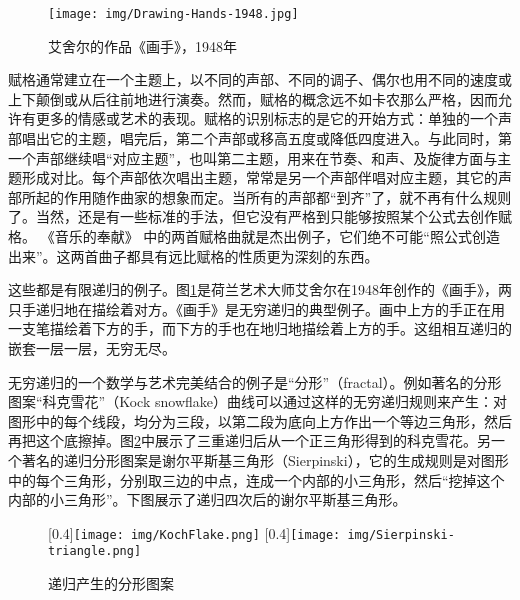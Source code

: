 \documentclass[b5paper]{ctexart}
\begin{document}
\begin{figure}[htbp]
 \centering
 \texttt{[image: img/Drawing-Hands-1948.jpg]}
 \caption{艾舍尔的作品《画手》，1948年}
 \label{fig:Drawing-Hands}
\end{figure}

赋格通常建立在一个主题上，以不同的声部、不同的调子、偶尔也用不同的速度或上下颠倒或从后往前地进行演奏。然而，赋格的概念远不如卡农那么严格，因而允许有更多的情感或艺术的表现。赋格的识别标志的是它的开始方式：单独的一个声部唱出它的主题，唱完后，第二个声部或移高五度或降低四度进入。与此同时，第一个声部继续唱“对应主题”，也叫第二主题，用来在节奏、和声、及旋律方面与主题形成对比。每个声部依次唱出主题，常常是另一个声部伴唱对应主题，其它的声部所起的作用随作曲家的想象而定。当所有的声部都“到齐”了，就不再有什么规则了。当然，还是有一些标准的手法，但它没有严格到只能够按照某个公式去创作赋格。 《音乐的奉献》 中的两首赋格曲就是杰出例子，它们绝不可能“照公式创造出来”。这两首曲子都具有远比赋格的性质更为深刻的东西\cite{GEB}。

这些都是有限递归的例子。图\ref{fig:Drawing-Hands}是荷兰艺术大师艾舍尔在1948年创作的《画手》，两只手递归地在描绘着对方。《画手》是无穷递归的典型例子。画中上方的手正在用一支笔描绘着下方的手，而下方的手也在地归地描绘着上方的手。这组相互递归的嵌套一层一层，无穷无尽。

无穷递归的一个数学与艺术完美结合的例子是“分形”（fractal）。例如著名的分形图案“科克雪花”（Kock snowflake）曲线可以通过这样的无穷递归规则来产生：对图形中的每个线段，均分为三段，以第二段为底向上方作出一个等边三角形，然后再把这个底擦掉。图\ref{fig:fractal}中展示了三重递归后从一个正三角形得到的科克雪花。另一个著名的递归分形图案是谢尔平斯基三角形（Sierpinski），它的生成规则是对图形中的每个三角形，分别取三边的中点，连成一个内部的小三角形，然后“挖掉这个内部的小三角形”。下图展示了递归四次后的谢尔平斯基三角形。

\begin{figure}[htbp]
 \centering
 [0.4\linewidth]{\texttt{[image: img/KochFlake.png]}}
 [0.4\linewidth]{\texttt{[image: img/Sierpinski-triangle.png]}}
 \caption{递归产生的分形图案}
 \label{fig:fractal}
\end{figure}
\end{document}

